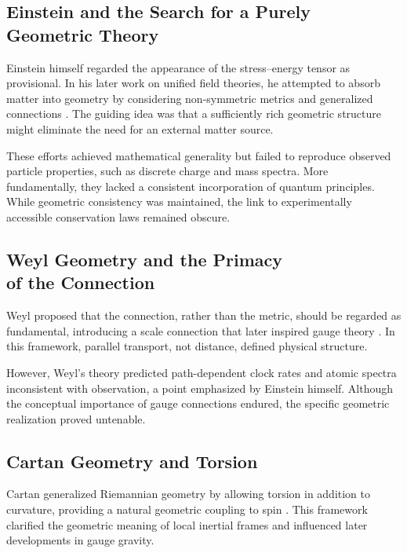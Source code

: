 \documentclass[%
 reprint,
 amsmath,amssymb,
 aps,
 prb,
]{revtex4-2}
\numberwithin{equation}{section}
\begin{document}
\subsection{Einstein and the Search for a Purely\\ Geometric Theory}
\label{sec:einstein_geo}

Einstein himself regarded the appearance of the stress--energy tensor as provisional. In his later work on unified field theories, he attempted to absorb matter into geometry by considering non-symmetric metrics and generalized connections \cite{EinsteinUnified}. The guiding idea was that a sufficiently rich geometric structure might eliminate the need for an external matter source.

These efforts achieved mathematical generality but failed to reproduce observed particle properties, such as discrete charge and mass spectra. More fundamentally, they lacked a consistent incorporation of quantum principles. While geometric consistency was maintained, the link to experimentally accessible conservation laws remained obscure.

\subsection{Weyl Geometry and the Primacy\\ of the Connection}
\label{sec:weyl}

Weyl proposed that the connection, rather than the metric, should be regarded as fundamental, introducing a scale connection that later inspired gauge theory \cite{Weyl1918}. In this framework, parallel transport, not distance, defined physical structure.

However, Weyl's theory predicted path-dependent clock rates and atomic spectra inconsistent with observation, a point emphasized by Einstein himself. Although the conceptual importance of gauge connections endured, the specific geometric realization proved untenable.

\subsection{Cartan Geometry and Torsion}
\label{sec:cartan}

Cartan generalized Riemannian geometry by allowing torsion in addition to curvature, providing a natural geometric coupling to spin \cite{Cartan1922}. This framework clarified the geometric meaning of local inertial frames and influenced later developments in gauge gravity.
\end{document}
